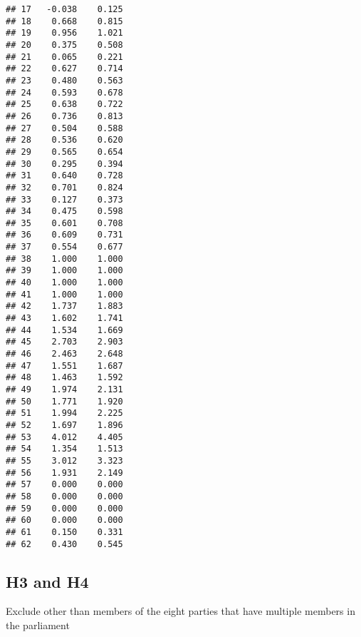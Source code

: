 \documentclass[
]{article}
\newenvironment{Shaded}{\begin{snugshade}}{\end{snugshade}}
\newcommand{\KeywordTok}[1]{\textcolor[rgb]{0.13,0.29,0.53}{\textbf{#1}}}
\newcommand{\NormalTok}[1]{#1}
\newcommand{\OperatorTok}[1]{\textcolor[rgb]{0.81,0.36,0.00}{\textbf{#1}}}
\newcommand{\StringTok}[1]{\textcolor[rgb]{0.31,0.60,0.02}{#1}}
\begin{document}
\begin{verbatim}
## 17   -0.038    0.125
## 18    0.668    0.815
## 19    0.956    1.021
## 20    0.375    0.508
## 21    0.065    0.221
## 22    0.627    0.714
## 23    0.480    0.563
## 24    0.593    0.678
## 25    0.638    0.722
## 26    0.736    0.813
## 27    0.504    0.588
## 28    0.536    0.620
## 29    0.565    0.654
## 30    0.295    0.394
## 31    0.640    0.728
## 32    0.701    0.824
## 33    0.127    0.373
## 34    0.475    0.598
## 35    0.601    0.708
## 36    0.609    0.731
## 37    0.554    0.677
## 38    1.000    1.000
## 39    1.000    1.000
## 40    1.000    1.000
## 41    1.000    1.000
## 42    1.737    1.883
## 43    1.602    1.741
## 44    1.534    1.669
## 45    2.703    2.903
## 46    2.463    2.648
## 47    1.551    1.687
## 48    1.463    1.592
## 49    1.974    2.131
## 50    1.771    1.920
## 51    1.994    2.225
## 52    1.697    1.896
## 53    4.012    4.405
## 54    1.354    1.513
## 55    3.012    3.323
## 56    1.931    2.149
## 57    0.000    0.000
## 58    0.000    0.000
## 59    0.000    0.000
## 60    0.000    0.000
## 61    0.150    0.331
## 62    0.430    0.545
\end{verbatim}

\newpage

\hypertarget{h3-and-h4}{%
\subsection{H3 and H4}\label{h3-and-h4}}

Exclude other than members of the eight parties that have multiple
members in the parliament

\begin{Shaded}
\end{Shaded}
\end{document}
